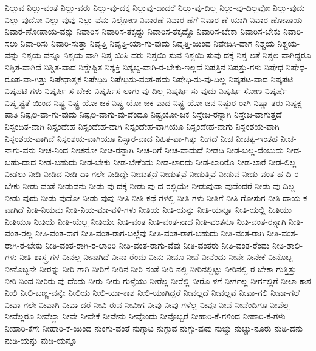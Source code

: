 {ನಿಲ್ಲುವ
ನಿಲ್ಲು-ವಂತೆ
ನಿಲ್ಲು-ವರು
ನಿಲ್ಲು-ವು-ದಕ್ಕೆ
ನಿಲ್ಲುವು-ದಾದರೆ
ನಿಲ್ಲು-ವು-ದಿಲ್ಲ
ನಿಲ್ಲು-ವು-ದಿಲ್ಲವೋ
ನಿಲ್ಲು-ವುದು
ನಿಲ್ಲು-ವುದೋ
ನಿಲ್ಲು-ವುವು
ನಿಲ್ಲು-ವೆನು
ನಿಲ್ಲೋಣ
ನಿವಾರಣೆ
ನಿವಾರ-ಣೆಗೆ
ನಿವಾರ-ಣೆ-ಯಾಗಿ
ನಿವಾರ-ಣೋಪಾಯ
ನಿವಾರ-ಣೋಪಾಯ-ವನ್ನು
ನಿವಾರಿಸ
ನಿವಾರಿಸ-ತಕ್ಕದ್ದು
ನಿವಾರಿಸ-ತಕ್ಕದ್ದೊ
ನಿವಾರಿಸ-ಬೇಕಾ
ನಿವಾರಿಸ-ಬೇಕು
ನಿವಾರಿ-ಸಲು
ನಿವಾ-ರಿಸು
ನಿವಾರಿ-ಸುತ್ತಾ
ನಿವೃತ್ತಿ
ನಿವೃತ್ತಿ-ಯಾ-ಗು-ವುದು
ನಿವೃತ್ತಿ-ಯಿಂದ
ನಿವೇದಿಸಿ-ದಾಗ
ನಿಶ್ಚಯ
ನಿಶ್ಚಯ-ವನ್ನು
ನಿಶ್ಚಯ-ವನ್ನೂ
ನಿಶ್ಚಯ-ವಾಗಿ
ನಿಶ್ಚ-ಯಿಸಿ-ದರು
ನಿಶ್ಚಯಿ-ಸುವ
ನಿಶ್ಚಯಿ-ಸುವು-ದಕ್ಕೆ
ನಿಶ್ಚ-ಲತೆ
ನಿಶ್ಚಲ-ವಾಗಿದ್ದರೂ
ನಿಶ್ಚಿತ-ವಾಗಿದೆ
ನಿಶ್ಚಿತ-ವಾದ
ನಿಶ್ಚೇಷ್ಟಿತ
ನಿಶ್ಯಕ್ತಿ
ನಿಶ್ಯಬ್ದ-ವಾಗಿ-ರ-ಬೇಕು-ಇಲ್ಲದೆ
ನಿಷತ್ತಿನ
ನಿಷತ್ತು-ಗಳು
ನಿಷೇಧ
ನಿಷೇಧ-ರೂಪ-ವಾ-ಗಿತ್ತು
ನಿಷೇಧಾತ್ಮಕ
ನಿಷೇಧಿಸಿ
ನಿಷೇಧಿಸು-ವಂತ-ಹದು
ನಿಷೇಧಿ-ಸು-ವು-ದಿಲ್ಲ
ನಿಷ್ಕಪಟ-ವಾದ
ನಿಷ್ಕಪಟಿ
ನಿಷ್ಕಪಟಿ-ಗಳು
ನಿಷ್ಕರ್ಷಿ-ಸ-ಬೇಕು
ನಿಷ್ಕರ್ಷಿಸ-ಲಾಗು-ವು-ದಿಲ್ಲ
ನಿಷ್ಕರ್ಷಿ-ಸು-ವುದು
ನಿಷ್ಕರ್ಷಿ-ಸೋಣ
ನಿಷ್ಕರ್ಷೆ
ನಿಷ್ಕೃಷ್ಟತೆ-ಯಿಂದ
ನಿಷ್ಟ್ರ
ನಿಷ್ಟ್ರ-ಯೋ-ಜಕ
ನಿಷ್ಟ್ರ-ಯೋ-ಜಕ-ವಾದ
ನಿಷ್ಟ್ರ-ಯೋ-ಜನ
ನಿಷ್ಠುರ-ರಾಗಿ
ನಿಷ್ಣಾ-ತರು
ನಿಷ್ಪಕ್ಷ-ಪಾತಿ
ನಿಷ್ಪಲ-ವಾ-ಗು-ವುದು
ನಿಷ್ಪಲ-ವಾಗು-ವು-ದೆಂದೂ
ನಿಷ್ಪ್ರಯೋ-ಜಕ
ನಿಸ್ತೇಜ-ರನ್ನಾಗಿ
ನಿಸ್ತೇಜ-ವಾಗುತ್ತದೆ
ನಿಸ್ಪಂದಿತ-ವಾಗಿ
ನಿಸ್ಸಂದೇಹ
ನಿಸ್ಸಂದೇಹ-ವಾಗಿ
ನಿಸ್ಸಂದೇಹ-ವಾಗಿಯೂ
ನಿಸ್ಸಂದೇಹ-ವಾಗು
ನಿಸ್ಸಂಶಯ-ವಾಗಿ
ನಿಸ್ಸಂಶಯ-ವಾಗಿದೆ
ನಿಸ್ಸಂಶಯ-ವಾಗಿಯೂ
ನಿಸ್ಸಾರ-ವಾದ
ನಿಹಿತ-ವಾ-ಗಿತ್ತು
ನೀಗದೆ
ನೀಚ
ನೀಚತ್ವ-ಇಂತಹ
ನೀಚ-ನಾಗು-ವನು
ನೀಚ-ನಿಂದ
ನೀಚನೋ
ನೀಚ-ರನ್ನಾಗಿ
ನೀಚ-ರಿಗೆ
ನೀಚ-ವಾದುದೆ
ನೀಡದಿ
ನೀಡ-ಬಲ್ಲ-ದೆಂಬುದು
ನೀಡ-ಬಹು-ದಾದ
ನೀಡ-ಬಹುದು
ನೀಡ-ಬೇಕು
ನೀಡ-ಬೇಕೆಂದು
ನೀಡ-ಲಾರದು
ನೀಡ-ಲಾರಿರೊ
ನೀಡ-ಲಾರೆ
ನೀಡ-ಲಿಲ್ಲ
ನೀಡಲು
ನೀಡಿ
ನೀಡಿದ
ನೀಡಿ-ದಾ-ಗಲೇ
ನೀಡಿದ್ದೇ
ನೀಡುತ್ತದೆ
ನೀಡುತ್ತವೆ
ನೀಡುತ್ತಿವೆ
ನೀಡುವ
ನೀಡು-ವಂತ-ಹ-ದಿ-ರ-ಬೇಕು
ನೀಡು-ವಂತೆ
ನೀಡುವನು
ನೀಡು-ವು-ದಕ್ಕೆ
ನೀಡು-ವು-ದ-ರಲ್ಲಿಯೇ
ನೀಡುವುದಾ-ವುದೆಂದರೆ
ನೀಡು-ವು-ದಿಲ್ಲ
ನೀಡು-ವುದು
ನೀಡು-ವುದೋ
ನೀಡು-ವುವು
ನೀತಿ
ನೀತಿ-ಕಥೆ-ಗಳಲ್ಲಿ
ನೀತಿ-ಗಳು
ನೀತಿಗೆ
ನೀತಿ-ಗೋಸುಗ
ನೀತಿ-ದಾಯ-ಕ-ವಾಗಿದೆ
ನೀತಿ-ನಿಯಮ
ನೀತಿ-ನಿಯ-ಮಾ-ವಳಿ-ಗಳು
ನೀತಿಯ
ನೀತಿ-ಯನ್ನು
ನೀತಿ-ಯನ್ನೂ
ನೀತಿ-ಯಲ್ಲಿ
ನೀತಿಯು
ನೀತಿಯೂ
ನೀತಿಯೆ
ನೀತಿ-ಯೆಲ್ಲ
ನೀತಿಯೇ
ನೀತಿ-ವಂತ
ನೀತಿ-ವಂತ-ನಾದ
ನೀತಿ-ವಂತನೂ
ನೀತಿ-ವಂತ-ರನ್ನಾಗಿ
ನೀತಿ-ವಂತ-ರಲ್ಲ
ನೀತಿ-ವಂತ-ರಾಗ
ನೀತಿ-ವಂತ-ರಾಗ-ಬಲ್ಲೆವು
ನೀತಿ-ವಂತ-ರಾಗ-ಬಹುದು
ನೀತಿ-ವಂತ-ರಾಗಿ
ನೀತಿ-ವಂತ-ರಾಗಿ-ರ-ಬೇಕು
ನೀತಿ-ವಂತ-ರಾಗಿ-ರ-ಲಾರಿರಿ
ನೀತಿ-ವಂತ-ರಾಗು-ವೆವು
ನೀತಿ-ವಂತರು
ನೀತಿ-ವಂತ-ರೆಂದು
ನೀತಿ-ಶಾಲಿ-ಗಳು
ನೀತಿ-ಶಾಸ್ತ್ರ-ಗಳ
ನೀನಲ್ಲ
ನೀನಾಗಿದೆ
ನೀನಾ-ರೆಂದು
ನೀನು
ನೀನೂ
ನೀನೆ
ನೀನೆಂದು
ನೀನೇ
ನೀನೇಕೆ
ನೀನೊಬ್ಬ
ನೀನೊಬ್ಬನೇ
ನೀರನ್ನು
ನೀರಿ-ಗಾಗಿ
ನೀರಿಗೆ
ನೀರಿನ
ನೀರಿ-ನಂತೆ
ನೀರಿ-ನಲ್ಲಿ
ನೀರಿನಲ್ಲಿಟ್ಟು
ನೀರಿನಲ್ಲಿ-ರ-ಬೇಕಾ-ಗುತ್ತಿತ್ತು
ನೀರಿ-ನಿಂದ
ನೀರಿರು-ವು-ದೆಂದು
ನೀರು
ನೀರು-ಗುಳ್ಳೆಯು
ನೀರೆಲ್ಲ
ನೀರೆಲ್ಲಿ
ನೀರೊ-ಳಗೆ
ನೀರ್ಗಲ್ಲ
ನೀರ್ಗಲ್ಲಿಗೆ
ನೀಲಾ-ಕಾಶ
ನೀಲಿ
ನೀಲಿ-ಬಣ್ಣ-ವನ್ನೇ
ನೀಲಿಯ
ನೀಲಿ-ಯಾ-ಕಾಶ
ನೀಲಿ-ಯಾಗಿದ್ದರೆ
ನೀವಲ್ಲದೆ
ನೀವಲ್ಲವೆ
ನೀವಾ-ಗಲಿ
ನೀವಾ-ಗಲೆ
ನೀವಾ-ಗಲೇ
ನೀವಾಗಿ
ನೀವಾ-ದರೆ
ನೀವಿ-ರುವ
ನೀವೀಗ
ನೀವು
ನೀವು-ಗಳೆಲ್ಲ
ನೀವೂ
ನೀವೆ
ನೀವೆಂದಿಗೂ
ನೀವೆಲ್ಲ
ನೀವೆಲ್ಲರೂ
ನೀವೆಲ್ಲಾ
ನೀವೇ
ನೀವೇಕೆ
ನೀವೇನು
ನೀವೊಂದು
ನೀವೊಬ್ಬರೆ
ನೀಹಾರಿ-ಕೆ-ಗಳಿಂದ
ನೀಹಾರಿ-ಕೆ-ಗಳು
ನೀಹಾರಿ-ಕೆಗೇ
ನೀಹಾರಿ-ಕೆ-ಯಿಂದ
ನುಂಗು-ವಂತೆ
ನುಗ್ಗಾಟ
ನುಗ್ಗುವ
ನುಗ್ಗು-ವುವು
ನುಚ್ಚು
ನುಚ್ಚು-ನೂರು
ನುಡಿ-ದನು
ನುಡಿ-ಯನ್ನು
ನುಡಿ-ಯನ್ನೂ
}
